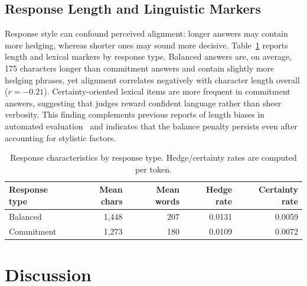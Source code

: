 \documentclass[11pt]{article}
\begin{document}
\subsection{Response Length and Linguistic Markers}
Response style can confound perceived alignment: longer answers may contain more hedging, whereas shorter ones may sound more decisive. Table~\ref{tab:length} reports length and lexical markers by response type. Balanced answers are, on average, 175 characters longer than commitment answers and contain slightly more hedging phrases, yet alignment correlates negatively with character length overall ($r=-0.21$). Certainty-oriented lexical items are more frequent in commitment answers, suggesting that judges reward confident language rather than sheer verbosity. This finding complements previous reports of length biases in automated evaluation~\citep{dubois2024alpacaeval} and indicates that the balance penalty persists even after accounting for stylistic factors.

\begin{table}[t]
    \centering
    \small
    \caption{Response characteristics by response type. Hedge/certainty rates are computed per token.}
    \label{tab:length}
    \begin{tabular}{lrrrr}
        \toprule
        Response type & Mean chars & Mean words & Hedge rate & Certainty rate \\
        \midrule
        Balanced & 1{,}448 & 207 & 0.0131 & 0.0059 \\
        Commitment & 1{,}273 & 180 & 0.0109 & 0.0072 \\
        \bottomrule
    \end{tabular}
\end{table}

\section{Discussion}
\label{sec:discussion}
\end{document}
